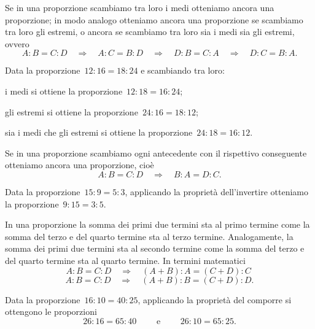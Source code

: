 \begin{proprieta}
  Se in una proporzione scambiamo tra loro i medi otteniamo ancora una proporzione;
in modo analogo otteniamo ancora una proporzione se scambiamo tra loro gli estremi,
o ancora se scambiamo tra loro sia i medi sia gli estremi, ovvero
\[A:B=C:D\quad\Rightarrow\quad A:C=B:D\quad\Rightarrow\quad D:B=C:A\quad\Rightarrow\quad D:C=B:A.\]
\end{proprieta}

\begin{exrig}
 \begin{esempio}
Data la proporzione~$12:16=18:24$ e scambiando tra loro:
\begin{itemize*}
  \item i medi si ottiene la proporzione~$12:18=16:24$;
  \item gli estremi si ottiene la proporzione~$24:16=18:12$;
  \item sia i medi che gli estremi si ottiene la proporzione~$24:18=16:12$.
\end{itemize*}

 \end{esempio}
\end{exrig}


\begin{proprieta}
  Se in una proporzione scambiamo ogni antecedente con il rispettivo conseguente
otteniamo ancora una proporzione, cioè
\[A:B=C:D\quad\Rightarrow\quad B:A=D:C.\]
\end{proprieta}

\begin{exrig}
 \begin{esempio}
Data la proporzione~$15:9=5:3$, applicando la proprietà dell'invertire
otteniamo la proporzione~$9:15=3:5$.
 \end{esempio}
\end{exrig}

\begin{proprieta}
  In una proporzione la somma dei primi due termini sta al primo termine come la
somma del terzo e del quarto termine sta al terzo termine. Analogamente,
la somma dei primi due termini sta al secondo termine come la somma del terzo e del quarto
termine sta al quarto termine. In termini matematici
\[A:B=C:D\quad\Rightarrow\quad (A+B):A=(C+D):C\phantom{.}\]
\[A:B=C:D\quad\Rightarrow\quad (A+B):B=(C+D):D.\]
\end{proprieta}
\pagebreak
\begin{exrig}
 \begin{esempio}
Data la proporzione~$16:10=40:25$, applicando la proprietà del comporre si ottengono le proporzioni
\[26:16=65:40\qquad\text{ e }\qquad26:10=65:25.\]
 \end{esempio}
\end{exrig}

